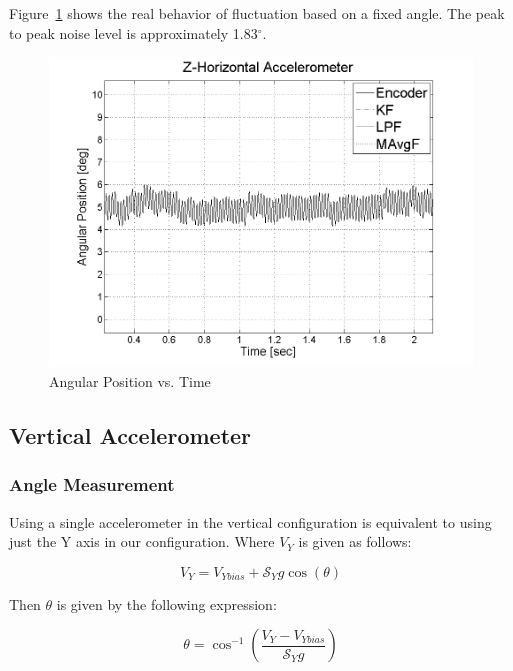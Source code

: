 \documentclass{article}
\theoremstyle{plain}
\theoremstyle{definition}
\theoremstyle{remark}
\newcommand{\Sens}{\mathcal{S}}
\begin{document}
Figure~\ref{Z_Peak2peak} shows the real behavior of fluctuation based on a fixed angle. The peak to peak noise level is approximately 1.83$^{\circ}$.

\begin{figure}[hbt]
\begin{center}
\includegraphics[width = 13cm]{Z_Peak2peak.png}
\caption{Angular Position vs. Time}
\label{Z_Peak2peak}
\end{center}
\end{figure}

\subsection{Vertical Accelerometer}

\subsubsection{Angle Measurement}

Using a single accelerometer in the vertical configuration is equivalent to using just the Y axis in our configuration.  Where $V_{Y}$ is given as follows:

$$ V_{Y} = V_{Ybias} + \Sens_{Y} g \cos(\theta) $$

Then $\theta$ is given by the following expression:

\begin{equation}
\theta = \cos^{-1}\left( \frac{V_{Y} - V_{Ybias}}{\Sens_{Y} g}\right)
\label{verticalEQ}
\end{equation}
\end{document}
